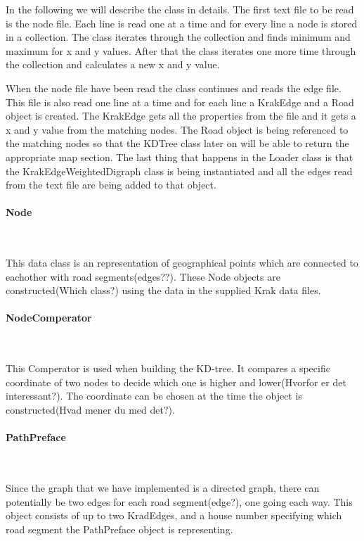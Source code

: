 \documentclass[a4paper,10pt,titlepage]{article}
\begin{document}
In the following we will describe the class in details. The first text file to be read is the node file. Each line is read one at a time and for every line a node is stored in a collection. The class iterates through the collection and finds minimum and maximum for x and y values. After that the class iterates one more time through the collection and calculates a new x and y value.  

When the node file have been read the class continues and reads the edge file. This file is also read one line at a time and for each line a KrakEdge and a Road object is created. The KrakEdge gets all the properties from the file and it gets a x and y value from the matching nodes. The Road object is being referenced to the matching nodes so that the KDTree class later on will be able to return the appropriate map section. The last thing that happens in the Loader class is that the KrakEdgeWeightedDigraph class is being instantiated and all the edges read from the text file are being added to that object. 

				\paragraph{Node}\mbox{}\
				
				This data class is an representation of geographical points which are connected to eachother with road segments(edges??). These Node objects are constructed(Which class?) using the data in the supplied Krak data files. 
				
				\paragraph{NodeComperator}\mbox{}\
				
This Comperator is used when building the KD-tree. It compares a specific coordinate of two nodes to decide which one is higher and lower(Hvorfor er det interessant?). The coordinate can be chosen at the time the object is constructed(Hvad mener du med det?).

				\paragraph{PathPreface}\mbox{}\
				
Since the graph that we have implemented is a directed graph, there can potentially be two edges for each road segment(edge?), one going each way. This object consists of up to two KradEdges, and a house number specifying which road segment the PathPreface object is representing.
\end{document}
